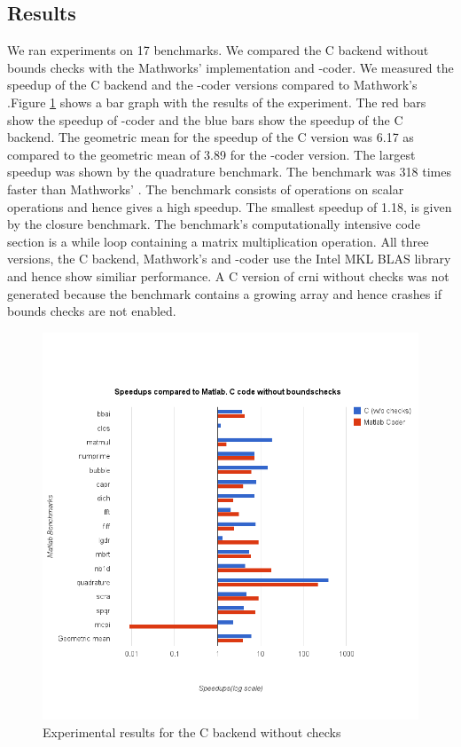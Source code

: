 \subsection{\matlab Results}
We ran experiments on 17 \matlab benchmarks. We compared the C backend without bounds checks with the Mathworks' \matlab implementation and \matlab-coder. We measured the speedup of the C backend and the \matlab-coder versions compared to  Mathwork's \matlab.Figure \ref{fig:results_cwochecks} shows a bar graph with the results of the experiment. The red bars show the speedup of \matlab-coder and the blue bars show the speedup of the C backend. The geometric mean for the speedup of the C version was 6.17 as compared to the geometric mean of 3.89 for the \matlab-coder version. The largest speedup was shown by the quadrature benchmark. The benchmark was 318 times faster than Mathworks' \matlab. The benchmark consists of operations on scalar operations and hence gives a high speedup. The smallest speedup of 1.18, is given by the closure benchmark. The benchmark's computationally intensive code section is a while loop containing a matrix multiplication operation. All three versions, the C backend, Mathwork's \matlab and \matlab-coder use the Intel MKL BLAS library and hence show similiar performance. A C version of crni without checks was not generated because the benchmark contains a growing array and hence crashes if bounds checks are not enabled. 
\begin{figure}[htbp]
\centering
\includegraphics[scale=0.6]{Figures/results_cwochecks.png}
\caption{Experimental results for the C backend without checks}
\label{fig:results_cwochecks}
\end{figure}

